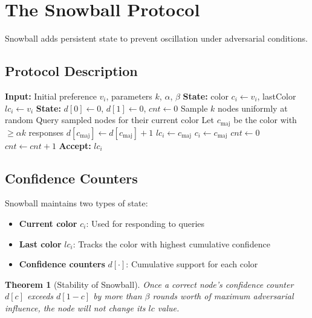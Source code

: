 \documentclass[11pt,a4paper]{article}
\newtheorem{theorem}{Theorem}
\begin{document}
\section{The Snowball Protocol}

Snowball adds persistent state to prevent oscillation under adversarial conditions.

\subsection{Protocol Description}

\begin{algorithm}
\caption{Snowball Protocol for Node $i$}
\begin{algorithmic}[1]
\STATE \textbf{Input:} Initial preference $v_i$, parameters $k$, $\alpha$, $\beta$
\STATE \textbf{State:} color $c_i \gets v_i$, lastColor $lc_i \gets v_i$
\STATE \textbf{State:} $d[0] \gets 0$, $d[1] \gets 0$, $cnt \gets 0$
    \STATE Sample $k$ nodes uniformly at random
    \STATE Query sampled nodes for their current color
    \STATE Let $c_{\text{maj}}$ be the color with $\geq \alpha k$ responses
        \STATE $d[c_{\text{maj}}] \gets d[c_{\text{maj}}] + 1$
            \STATE $lc_i \gets c_{\text{maj}}$
        \ENDIF
            \STATE $c_i \gets c_{\text{maj}}$
            \STATE $cnt \gets 0$
        \ELSE
            \STATE $cnt \gets cnt + 1$
        \ENDIF
    \ENDIF
\ENDWHILE
\STATE \textbf{Accept:} $lc_i$
\end{algorithmic}
\end{algorithm}

\subsection{Confidence Counters}

Snowball maintains two types of state:
\begin{itemize}
    \item \textbf{Current color} $c_i$: Used for responding to queries
    \item \textbf{Last color} $lc_i$: Tracks the color with highest cumulative confidence
    \item \textbf{Confidence counters} $d[\cdot]$: Cumulative support for each color
\end{itemize}

\begin{theorem}[Stability of Snowball]
\label{thm:snowball-stable}
Once a correct node's confidence counter $d[c]$ exceeds $d[1-c]$ by more than $\beta$ rounds worth of maximum adversarial influence, the node will not change its $lc$ value.
\end{theorem}
\end{document}
